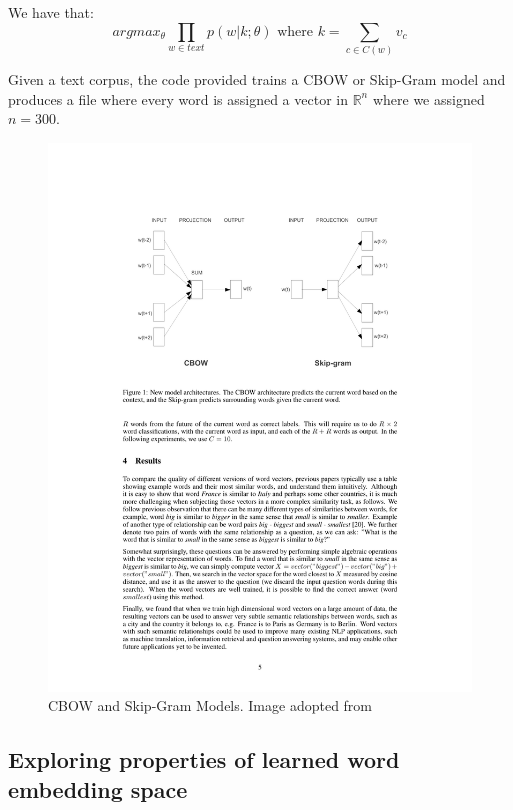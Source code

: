 We have that:
\begin{equation}
	argmax_{\theta} \prod_{w\in text} p(w|k;\theta) \text{ where } k = \sum_{c \in C(w)} v_c
\end{equation}



Given a text corpus, the code provided trains a CBOW or Skip-Gram model and produces a file where every word is assigned a vector in $\mathbb{R}^n$ where we assigned $n=300$.


\begin{figure}[h]
\centering
\includegraphics[width=\textwidth]{./images/model_images.pdf}
\caption{CBOW and Skip-Gram Models. Image adopted from \cite{mikolov1}}
\label{fig:top_k}
\end{figure}

\clearpage 


\subsection{Exploring properties of learned word embedding space}